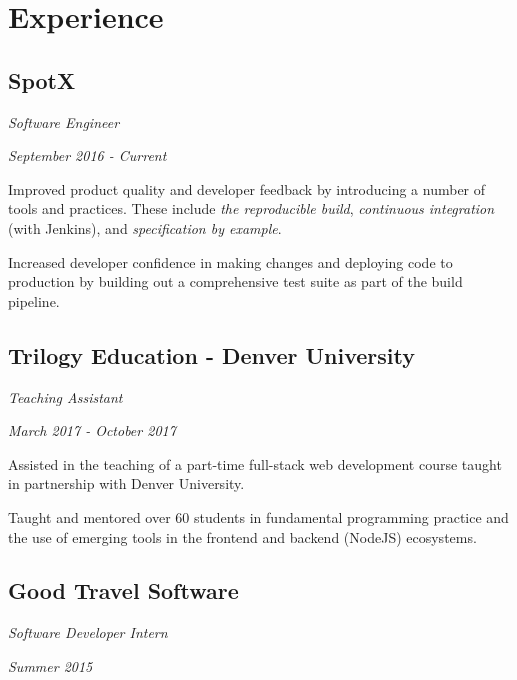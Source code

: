 \section*{Experience}
\subsection*{SpotX}
\noindent\begin{minipage}[b]{0.5\textwidth}
  \flushleft
  \emph{Software Engineer}
\end{minipage}
\noindent\begin{minipage}[b]{0.5\textwidth}
  \flushright
  \emph{September 2016 - Current}
\end{minipage}

Improved product quality and developer feedback by introducing a number of tools
and practices. These include \emph{the reproducible build}, \emph{continuous
integration} (with Jenkins), and \emph{specification by example}.

Increased developer confidence in making changes and deploying code to
production by building out a comprehensive test suite as part of the build
pipeline.

\subsection*{Trilogy Education - Denver University}
\noindent\begin{minipage}[b]{0.5\textwidth}
  \flushleft
  \emph{Teaching Assistant}
\end{minipage}
\noindent\begin{minipage}[b]{0.5\textwidth}
  \flushright
  \emph{March 2017 - October 2017}
\end{minipage}

Assisted in the teaching of a part-time full-stack web development course taught
in partnership with Denver University.

Taught and mentored over 60 students in fundamental programming practice and the
use of emerging tools in the frontend and backend (NodeJS) ecosystems.

\subsection*{Good Travel Software}
\noindent\begin{minipage}[b]{0.5\textwidth}
  \flushleft
  \emph{Software Developer Intern}
\end{minipage}
\noindent\begin{minipage}[b]{0.5\textwidth}
  \flushright
  \emph{Summer 2015}
\end{minipage}

